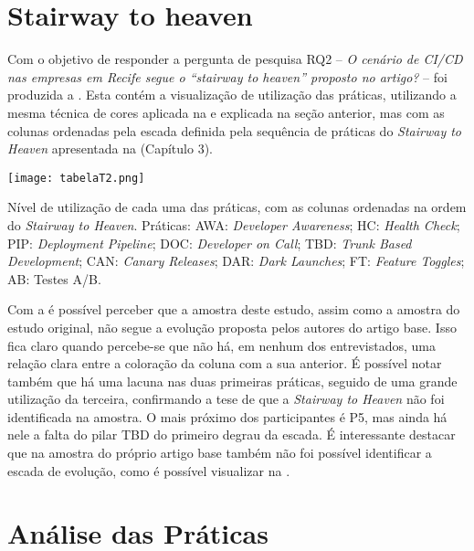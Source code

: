 \section{Stairway to heaven}

Com o objetivo de responder a pergunta de pesquisa RQ2 -- \emph{O cenário de CI/CD nas empresas em Recife segue o ``stairway to heaven'' proposto no artigo?} -- foi produzida a . Esta contém a visualização de utilização das práticas, utilizando a mesma técnica de cores aplicada na  e explicada na seção anterior, mas com as colunas ordenadas pela escada definida pela sequência de práticas do \emph{Stairway to Heaven} apresentada na  (Capítulo 3).

\begin{table}[ht]
\begin{center}
\texttt{[image: tabelaT2.png]}
\end{center}
\caption[Nível de utilização das práticas, com as colunas na ordem do \emph{Stairway to Heaven}]{
    Nível de utilização de cada uma das práticas, com as colunas ordenadas na ordem do \emph{Stairway to Heaven}. Práticas: AWA: \emph{Developer Awareness}; HC: \emph{Health Check}; PIP: \emph{Deployment Pipeline}; DOC: \emph{Developer on Call}; TBD: \emph{Trunk Based Development}; CAN: \emph{Canary Releases}; DAR: \emph{Dark Launches}; FT: \emph{Feature Toggles}; AB: Testes A/B.
}\label{tabela_t2}
\end{table}

Com a  é possível perceber que a amostra deste estudo, assim como a amostra do estudo original, não segue a evolução proposta pelos autores do artigo base. Isso fica claro quando percebe-se que não há, em nenhum dos entrevistados, uma relação clara entre a coloração da coluna com a sua anterior. É possível notar também que há uma lacuna nas duas primeiras práticas, seguido de uma grande utilização da terceira, confirmando a tese de que a \emph{Stairway to Heaven} não foi identificada na amostra. O mais próximo dos participantes é P5, mas ainda há nele a falta do pilar TBD do primeiro degrau da escada. É interessante destacar que na amostra do próprio artigo base também não foi possível identificar a escada de evolução, como é possível visualizar na .

\section{Análise das Práticas}

